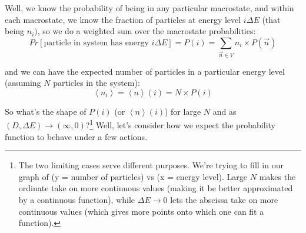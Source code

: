 \documentclass[letterpaper,12pt]{report}
\begin{document}
Well, we know the probability of being in any particular macrostate, and within each
macrostate, we know the fraction of particles at energy level \(i\Delta E\) 
(that being \(n_i)\),
so we do a weighted sum over the macrostate probabilities:
\[Pr[\text{particle in system has energy }i\Delta E] = P(i) =
\sum_{\vec{n}\in V}n_i \times P(\vec{n})\]

and we can have the expected number of particles in a particular energy level (assuming
\(N\) particles in the system):
\[\left<n_i\right> = \left<n\right>(i) = N \times P(i)\]

So what's the shape of \(P(i)\) (or \(\left<n\right>(i)\)) for large \(N\) and as 
\(\left(D,\Delta E\right) \rightarrow \left(\infty,0\right)\)?\footnote{
  The two limiting cases serve different purposes. We're trying to fill in our graph
  of (y = number of particles) vs (x = energy level). Large \(N\) makes the ordinate
  take on more continuous values (making it be better approximated by a continuous function),
  while \(\Delta E \rightarrow 0\) lets the abscissa take
  on more continuous values (which gives more points onto which one can fit a function).
} 
Well, let's consider how we expect the probability function to behave under a few actions.
\end{document}
